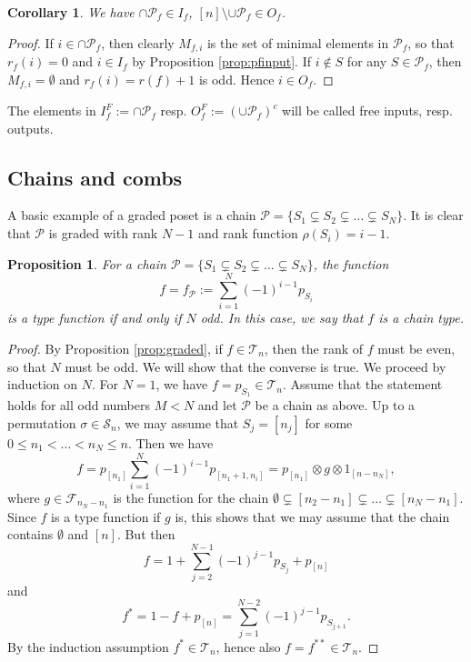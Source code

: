 \documentclass[12pt]{article}
\newtheorem{coro}{Corollary}
\newtheorem{prop}{Proposition}
\theoremstyle{definition}
\theoremstyle{remark}
\def\Te{\mathcal T}
\def\Fe{\mathcal F}
\def\Pe{\mathcal P}
\def\permut{\mathscr{S}}
\begin{document}
\begin{coro}\label{coro:free} We have $\cap{\Pe_f}\in I_f$, $[n]\setminus\cup{\Pe_f}\in O_f$.

\end{coro}

\begin{proof} If $i\in \cap\Pe_f$, then clearly $M_{f,i}$ is the set of minimal elements
in $\Pe_f$, so that $r_f(i)=0$ and $i\in I_f$ by Proposition \ref{prop:pfinput}. If
$i\notin S$ for any $S\in \Pe_f$, then $M_{f,i}=\emptyset$ and $r_f(i)=r(f)+1$ is odd.
Hence $i\in O_f$. 

\end{proof}

The elements in $I^F_{f}:=\cap\Pe_f$ resp. $O^F_{f}:=(\cup \Pe_f)^c$ will be called free inputs, resp.
outputs. 

\subsection{Chains and combs}

 A basic example of a graded poset is a chain  $\Pe=\{S_1\subsetneq S_2\subsetneq \dots \subsetneq
S_N\}$. It is clear that  $\Pe$ is graded with rank $N-1$
and rank function $\rho(S_i)=i-1$. 

\begin{prop}\label{prop:chains} For a chain   $\Pe=\{S_1\subsetneq S_2\subsetneq \dots \subsetneq
S_N\}$, the function  
\[
f=f_\Pe:=\sum_{i=1}^N (-1)^{i-1} p_{S_i}
\]
is a type function if and only if $N$ odd. In this case, we say that $f$ is a chain type.

\end{prop}

\begin{proof}
By Proposition \ref{prop:graded}, if $f\in \Te_n$, then the rank of $f$ must be even, so
that $N$ must be odd. 
We will show that the converse is true. We proceed by induction on $N$. For $N=1$, we have
$f=p_{S_1}\in \Te_n$. Assume that the statement holds for all odd numbers $M<N$ and let
$\Pe$ be a chain as above. Up to a permutation $\sigma\in \permut_n$, we may assume that
$S_j=[n_j]$ for some $0\le n_1<\dots <n_N\le n$. Then we have 
\[
f=p_{[n_1]}\sum_{i=1}^N (-1)^{i-1}p_{[n_1+1,n_i]}= p_{[n_1]}\otimes g\otimes 1_{[n-n_N]},
\]
where  $g\in
\Fe_{n_N-n_1}$ is the function for the chain $\emptyset\subsetneq [n_2-n_1]\subsetneq \dots
\subsetneq [n_N-n_1]$. Since $f$ is a type function if $g$ is, this shows that we may assume that 
the chain contains $\emptyset$ and $[n]$.  But then 
\[
f=1+\sum_{j=2}^{N-1} (-1)^{j-1}p_{S_j}+ p_{[n]} 
\]
and
\[
f^*=1-f+p_{[n]}=\sum_{j=1}^{N-2} (-1)^{j-1}p_{S_{j+1}}.
\]
By the induction assumption $f^*\in \Te_n$, hence also $f=f^{**}\in
\Te_n$.
\end{proof}
\end{document}
